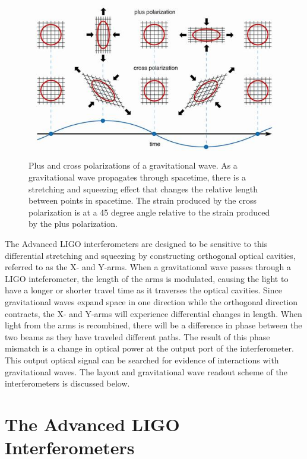 \begin{figure}[ht!]
\includegraphics[width=\textwidth]{figures/introduction/polarisations2}
\caption[Plus and cross polarizations]{Plus and cross polarizations %
         of a gravitational wave. As a gravitational wave propagates through spacetime, %
         there is a stretching and squeezing effect that changes the relative length between %
         points in spacetime. The strain produced by the cross polarization %
         is at a 45 degree angle relative to the strain produced by the plus %
         polarization. }
\label{fig:polarizations}
\end{figure}

The Advanced LIGO interferometers are designed to be sensitive 
to this differential stretching and squeezing by constructing orthogonal 
optical cavities, referred to as the X- and Y-arms. 
When a gravitational wave passes through a LIGO inteferometer, the length of 
the arms is modulated, causing the light to have a
longer or shorter travel time as it traverses the optical cavities. 
Since gravitational
waves expand space in one direction while the orthogonal direction contracts,     
the X- and Y-arms will experience differential changes in length. When light
from the arms is recombined, there will be a difference
in phase between the two beams as they have traveled different paths. 
The result of this phase mismatch is a change in optical power at the output 
port of the interferometer. This output optical signal can be searched for 
evidence of interactions with gravitational waves.
The layout and gravitational wave readout scheme of the interferometers is 
discussed below.

\section{The Advanced LIGO Interferometers}\label{sec:aligo}

